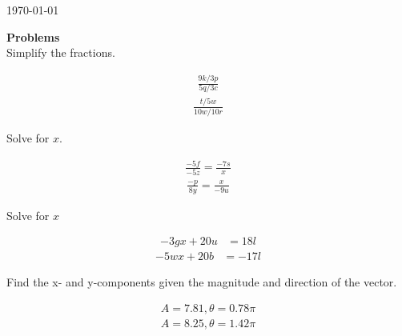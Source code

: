 \documentclass[letterpaper, 11pt]{article}
\begin{document}
 
\begin{flushright} \noindent\today \end{flushright} 

\noindent 
{ \bf \Large Problems } \\ 
 

 Simplify the fractions.   \\ 
\begin{multicols}{ 3 }
\begin{align} 
\frac{ 9k / 3p  } { 5q / 3c  }  \nonumber 
\end{align} 
\begin{align} 
\frac{ t / 5w  } { 10w / 10r  }  \nonumber 
\end{align} 
\end{multicols}

 Solve for $x$.  \\ 
\begin{multicols}{ 3 }
\begin{align} 
\frac{  -5f }{   -5z  } = \frac {  -7s }{ x  }  \nonumber 
\end{align} 
\begin{align} 
\frac{  -p }{  8y  } = \frac { x }{  -9u  }  \nonumber 
\end{align} 
\end{multicols}

 Solve for $x$  \\ 
\begin{multicols}{ 2 }
\begin{align} 
 -3gx +20u &= 18l \nonumber 
\end{align} 
\begin{align} 
 -5wx +20b &=  -17l \nonumber 
\end{align} 
\end{multicols}

 Find the x- and y-components given the magnitude and direction of the vector.  \\ 
\begin{multicols}{ 2 }
\begin{align}  
A =  7.81, \theta =  0.78 \pi \nonumber   
\end{align}    
\begin{align}  
A =  8.25, \theta =  1.42 \pi \nonumber   
\end{align}    
\end{multicols}
\end{document}
